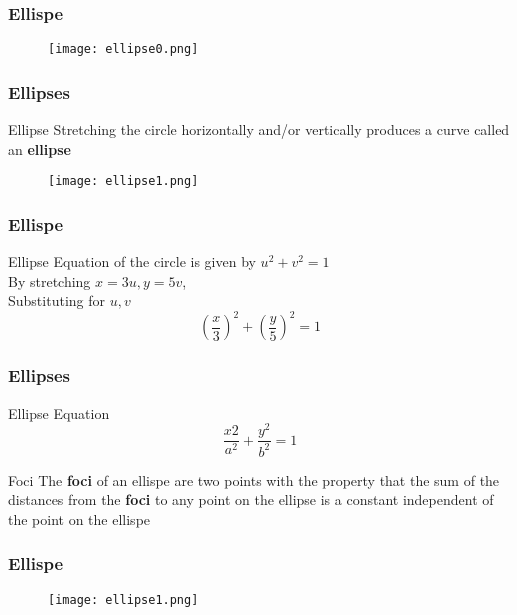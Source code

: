  \begin{frame}
  \frametitle{Ellispe}
  \begin{figure}
    \centering
    \texttt{[image: ellipse0.png]}
  \end{figure}
 \end{frame}


 \begin{frame}
  \frametitle{Ellipses}
  \begin{block}{Ellipse}
    Stretching the circle horizontally and/or vertically produces a curve called an \textbf{ellipse}
  \end{block}
  \begin{figure}
    \centering 
    \texttt{[image: ellipse1.png]}
  \end{figure}
 \end{frame}
 


 \begin{frame}
  \frametitle{Ellispe}
\begin{exampleblock}{Ellipse}
  Equation of the circle is given by \(u^{2} + v^{2} = 1\) \\
  By stretching \(x = 3u, y = 5v\), \\ Substituting for \(u,v\)  
  \[ \left( \frac{x}{3} \right)^{2} + \left(\frac{y}{5}\right)^{2} = 1 \]
\end{exampleblock} 
 
 \end{frame}
 \begin{frame}
  \frametitle{Ellipses}
  \begin{block}{Ellipse Equation}
    \[\frac{x{2}}{a^{2}} + \frac{y^{2}}{b^{2}} = 1 \] 
  \end{block}
  \begin{block}{Foci}
The \textbf{foci} of an ellispe are two points with the property that the
sum of the distances from the \textbf{foci} to any point on the ellipse is a constant independent of the point on the ellispe    
  \end{block} 
 
 \end{frame}

 \begin{frame}
  \frametitle{Ellispe}
  \begin{figure}
    \centering
    \texttt{[image: ellipse1.png]}
  \end{figure}
 \end{frame}

